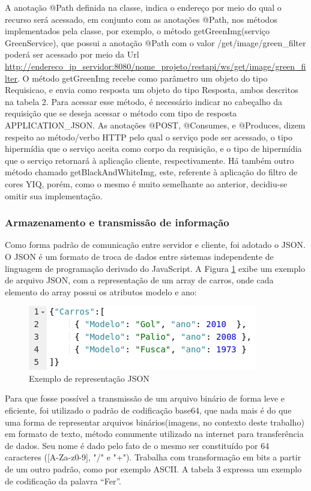 \documentclass[12pt]{article}
\begin{document}
A anotação @Path definida na classe, indica o endereço por meio do qual o recurso será acessado, em conjunto com as anotações @Path, nos métodos implementados pela classe, por exemplo, o método getGreenImg(serviço GreenService), que possui a anotação @Path com o valor /get/image/green\_filter poderá ser acessado por meio da Url \url{http://endereco_ip_servidor:8080/nome_projeto/restapi/ws/get/image/green_filter}.
 O método getGreenImg recebe como parâmetro um objeto do tipo Requisicao, e envia como resposta um objeto do tipo Resposta, ambos descritos na tabela 2. Para acessar esse método, é necessário indicar no cabeçalho da requisição que se deseja acessar o método com tipo de resposta APPLICATION\_JSON. As anotações @POST, @Consumes, e @Produces, dizem respeito ao método/verbo HTTP pelo qual o serviço pode ser acessado, o tipo hipermídia que o serviço aceita como corpo da requisição, e o tipo de hipermídia que o serviço retornará à aplicação cliente, respectivamente. Há também outro método chamado getBlackAndWhiteImg, este, referente à aplicação do filtro de cores YIQ, porém, como o mesmo é muito semelhante ao anterior, decidiu-se omitir sua implementação.

\subsubsection{Armazenamento e transmissão de informação}

Como forma padrão de comunicação entre servidor e cliente, foi adotado o JSON. O JSON é um formato de troca de dados entre sistemas independente de linguagem de programação derivado do JavaScript. A Figura \ref{fig:Figura4} exibe um exemplo de arquivo JSON, com a representação de um array de carros, onde cada elemento do array possui os atributos modelo e ano:

\begin{figure}[ht]
	\centering
	\includegraphics[width=.7\textwidth]{exemplo-json.png}
	\caption{Exemplo de representação JSON}
	\label{fig:Figura4}
\end{figure}

Para que fosse possível a transmissão de um arquivo binário de forma leve e eficiente, foi utilizado o padrão de codificação base64, que nada mais é do que uma forma de representar arquivos binários(imagens, no contexto deste trabalho) em formato de texto, método comumente utilizado na internet para transferência de dados.
Seu nome é dado pelo fato de o mesmo ser constituído por 64 caracteres ([A-Za-z0-9], "/" e "+"). Trabalha com transformação em bits a partir de um outro padrão, como por exemplo ASCII. A tabela 3 expressa um exemplo de codificação da palavra “Fer”.
\end{document}
